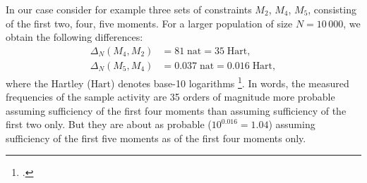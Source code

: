 \documentclass[\ifafour a4paper,12pt,\else a5paper,10pt,\fi%
onecolumn,oneside,article,%
british%
]{memoir}
\theoremstyle{remark}
\theoremstyle{innote}
\newcommand*{\citep}{\footcites}
\renewcommand*{\|}{\nonscript\,\vert\nonscript\;\mathopen{}}
\newcommand*{\sect}{\S}%
\newcommand*{\ydi}{\varDelta}
\newcommand*{\nat}{\textrm{nat}}
\newcommand*{\hart}{\textrm{Hart}}
\begin{document}
%
%
% 
%
%

\bigskip

In our case consider for example three sets of constraints $M_{2}$,
$M_{4}$, $M_{5}$, consisting of the first two, four, five moments. For a
larger population of size $N=10\,000$, we obtain the following differences:
\begin{equation}
  \label{eq:diff_suff_N}
  \begin{split}
  \ydi_{N}(M_{4},M_{2}) &= 81\;\nat = 35\;\hart,
\\    \ydi_{N}(M_{5},M_{4}) &= 0.037\;\nat = 0.016\;\hart,
  \end{split}
\end{equation}
where the Hartley ($\hart$) denotes base-10 logarithms
\citep[\sect~C.4]{iso2009}[it was called \enquote{ban} and used by Turing
and Good in their code-breaking work at Bletchley
Park:][]{good1985,good1950,good1969}[\sect~4.2]{jaynes1994_r2003}. In
words, the measured frequencies of the sample activity are 35 orders of
magnitude more probable assuming sufficiency of the first four moments than
assuming sufficiency of the first two only. But they are about as probable
($10^{0.016} = 1.04$) assuming sufficiency of the first five moments as of
the first four moments only.
\end{document}

